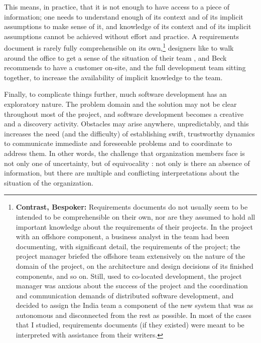 This means, in practice, that it is not enough to have access to a piece of information; one needs to understand enough of its context and of its implicit assumptions to make sense of it, and knowledge of its context and of its implicit assumptions cannot be achieved without effort and practice. A requirements document is rarely fully comprehensible on its own,\footnote{\textbf{Contrast, Bespoker:} Requirements documents do not usually seem to be intended to be comprehensible on their own, nor are they assumed to hold all important knowledge about the requirements of their projects. In the project with an offshore component, a business analyst in the team had been documenting, with significant detail, the requirements of the project; the project manager briefed the offshore team extensively on the nature of the domain of the project, on the architecture and design decisions of its finished components, and so on. Still, used to co-located development, the project manager was anxious about the success of the project and the coordination and communication demands of distributed software development, and decided to assign the India team a component of the new system that was as autonomous and disconnected from the rest as possible. In most of the cases that I studied, requirements documents (if they existed) were meant to be interpreted with assistance from their writers.} designers like to walk around the office to get a sense of the situation of their team \cite{Bellotti1996}, and Beck  recommends to have a customer on-site, and the full development team sitting together, to increase the availability of implicit knowledge to the team.

Finally, to complicate things further, much software development has an exploratory nature. The problem domain and the solution may not be clear throughout most of the project, and software development becomes a creative and a discovery activity. Obstacles may arise anywhere, unpredictably, and this increases the need (and the difficulty) of establishing swift, trustworthy dynamics to communicate immediate and foreseeable problems and to coordinate to address them. In other words, the challenge that organization members face is not only one of uncertainty, but of equivocality \cite{Daft1986}: not only is there an absence of information, but there are multiple and conflicting interpretations about the situation of the organization.

